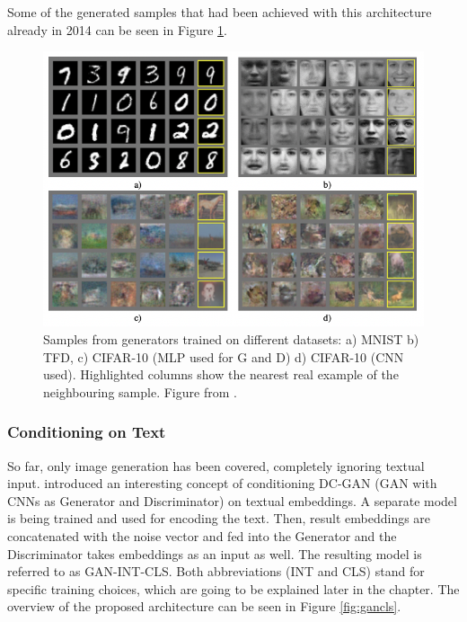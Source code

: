 \documentclass[
]{krantz}
\begin{document}
Some of the generated samples that had been achieved with this architecture already in 2014 can be seen in Figure \ref{fig:vanillagansamples}.

\begin{figure}

{\centering \includegraphics[width=0.8\linewidth]{figures/02-02-text-2-img/vanillagansamples} 

}

\caption{Samples from generators trained on different datasets: a) MNIST b) TFD, c) CIFAR-10 (MLP used for G and D) d) CIFAR-10 (CNN used). Highlighted columns show the nearest real example of the neighbouring sample. Figure from \citet{GAN2014}.}\label{fig:vanillagansamples}
\end{figure}



\hypertarget{conditioning-on-text}{%
\subsubsection{Conditioning on Text}\label{conditioning-on-text}}

So far, only image generation has been covered, completely ignoring textual input. \citet{GANTextToImage2016} introduced an interesting concept of conditioning DC-GAN (GAN with CNNs as Generator and Discriminator) on textual embeddings. A separate model is being trained and used for encoding the text. Then, result embeddings are concatenated with the noise vector and fed into the Generator and the Discriminator takes embeddings as an input as well. The resulting model is referred to as GAN-INT-CLS. Both abbreviations (INT and CLS) stand for specific training choices, which are going to be explained later in the chapter. The overview of the proposed architecture can be seen in Figure \ref{fig:gancls}.
\end{document}
